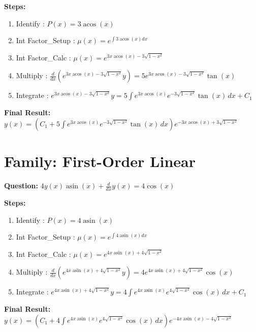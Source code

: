 \documentclass{article}
\begin{document}
\textbf{Steps:}
\begin{enumerate}
\item Identify :  $P(x) = 3 \operatorname{acos}{\left(x \right)}$
\item Int Factor_Setup :  $\mu(x) = e^{\int 3 \operatorname{acos}{\left(x \right)} dx}$
\item Int Factor_Calc :  $\mu(x) = e^{3 x \operatorname{acos}{\left(x \right)} - 3 \sqrt{1 - x^{2}}}$
\item Multiply :  $\frac{d}{dx}(e^{3 x \operatorname{acos}{\left(x \right)} - 3 \sqrt{1 - x^{2}}}y) = 5 e^{3 x \operatorname{acos}{\left(x \right)} - 3 \sqrt{1 - x^{2}}} \tan{\left(x \right)}$
\item Integrate :  $e^{3 x \operatorname{acos}{\left(x \right)} - 3 \sqrt{1 - x^{2}}}y = 5 \int e^{3 x \operatorname{acos}{\left(x \right)}} e^{- 3 \sqrt{1 - x^{2}}} \tan{\left(x \right)}\, dx + C_1$
\end{enumerate}
\textbf{Final Result:} $y{\left(x \right)} = \left(C_{1} + 5 \int e^{3 x \operatorname{acos}{\left(x \right)}} e^{- 3 \sqrt{1 - x^{2}}} \tan{\left(x \right)}\, dx\right) e^{- 3 x \operatorname{acos}{\left(x \right)} + 3 \sqrt{1 - x^{2}}}$

\section*{Family: First-Order Linear}
\textbf{Question:} $4 y{\left(x \right)} \operatorname{asin}{\left(x \right)} + \frac{d}{d x} y{\left(x \right)} = 4 \cos{\left(x \right)}$

\textbf{Steps:}
\begin{enumerate}
\item Identify :  $P(x) = 4 \operatorname{asin}{\left(x \right)}$
\item Int Factor_Setup :  $\mu(x) = e^{\int 4 \operatorname{asin}{\left(x \right)} dx}$
\item Int Factor_Calc :  $\mu(x) = e^{4 x \operatorname{asin}{\left(x \right)} + 4 \sqrt{1 - x^{2}}}$
\item Multiply :  $\frac{d}{dx}(e^{4 x \operatorname{asin}{\left(x \right)} + 4 \sqrt{1 - x^{2}}}y) = 4 e^{4 x \operatorname{asin}{\left(x \right)} + 4 \sqrt{1 - x^{2}}} \cos{\left(x \right)}$
\item Integrate :  $e^{4 x \operatorname{asin}{\left(x \right)} + 4 \sqrt{1 - x^{2}}}y = 4 \int e^{4 x \operatorname{asin}{\left(x \right)}} e^{4 \sqrt{1 - x^{2}}} \cos{\left(x \right)}\, dx + C_1$
\end{enumerate}
\textbf{Final Result:} $y{\left(x \right)} = \left(C_{1} + 4 \int e^{4 x \operatorname{asin}{\left(x \right)}} e^{4 \sqrt{1 - x^{2}}} \cos{\left(x \right)}\, dx\right) e^{- 4 x \operatorname{asin}{\left(x \right)} - 4 \sqrt{1 - x^{2}}}$
\end{document}
